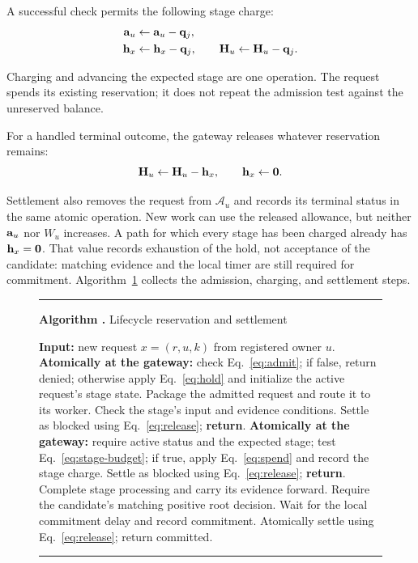 A successful check permits the following stage charge:
\begin{equation}
\begin{aligned}
\mathbf a_u&\leftarrow\mathbf a_u-\mathbf q_j,\\
\mathbf h_x&\leftarrow\mathbf h_x-\mathbf q_j,\qquad
\mathbf H_u\leftarrow\mathbf H_u-\mathbf q_j.
\end{aligned}
\label{eq:spend}
\end{equation}

Charging and advancing the expected stage are one operation. The request
spends its existing reservation; it does not repeat the admission test
against the unreserved balance.

For a handled terminal outcome, the gateway releases whatever reservation
remains:
\begin{equation}
\mathbf H_u\leftarrow\mathbf H_u-\mathbf h_x,\qquad \mathbf h_x\leftarrow\mathbf0.
\label{eq:release}
\end{equation}

Settlement also removes the request from $\mathcal A_u$ and records its
terminal status in the same atomic operation. New work can use the released
allowance, but neither $\mathbf a_u$ nor $W_u$ increases. A path for which every
stage has been charged already has $\mathbf h_x=\mathbf0$. That value records
exhaustion of the hold, not acceptance of the candidate: matching evidence
and the local timer are still required for commitment. Algorithm~\ref{alg:reservation}
collects the admission, charging, and settlement steps.

\begin{figure}[t]
\centering
\begin{minipage}{.98\columnwidth}
\hrule\smallskip
{}
\textbf{Algorithm \thealgorithm.} Lifecycle reservation and settlement
\label{alg:reservation}
\smallskip
\begin{algorithmic}[1]
\STATE \textbf{Input:} new request $x=(r,u,k)$ from registered owner $u$.
\STATE \textbf{Atomically at the gateway:} check Eq.~\eqref{eq:admit};
\STATE \quad if false, return denied; otherwise apply Eq.~\eqref{eq:hold}
\STATE \quad and initialize the active request's stage state.
\STATE Package the admitted request and route it to its worker.
\STATE Check the stage's input and evidence conditions.
\STATE Settle as blocked using Eq.~\eqref{eq:release}; \textbf{return}.
\ENDIF
\STATE \textbf{Atomically at the gateway:} require active status
\STATE \quad and the expected stage; test Eq.~\eqref{eq:stage-budget}; if true,
\STATE \quad apply Eq.~\eqref{eq:spend} and record the stage charge.
\STATE Settle as blocked using Eq.~\eqref{eq:release}; \textbf{return}.
\ENDIF
\STATE Complete stage processing and carry its evidence forward.
\ENDFOR
\STATE Require the candidate's matching positive root decision.
\STATE Wait for the local commitment delay and record commitment.
\STATE Atomically settle using Eq.~\eqref{eq:release}; return committed.
\end{algorithmic}
\smallskip\hrule
\end{minipage}
\end{figure}

